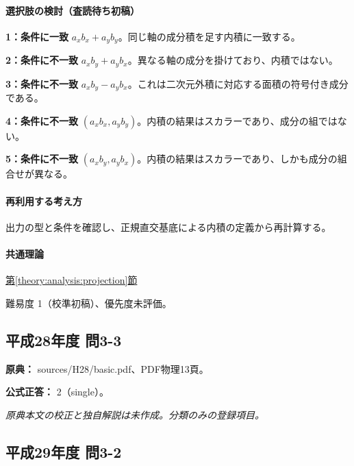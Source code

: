 \paragraph{選択肢の検討（査読待ち初稿）}\mbox{}\par

\noindent\textbf{1：条件に一致} \(a_xb_x+a_yb_y\)。同じ軸の成分積を足す内積に一致する。\par

\noindent\textbf{2：条件に不一致} \(a_xb_y+a_yb_x\)。異なる軸の成分を掛けており、内積ではない。\par

\noindent\textbf{3：条件に不一致} \(a_xb_y-a_yb_x\)。これは二次元外積に対応する面積の符号付き成分である。\par

\noindent\textbf{4：条件に不一致} \((a_xb_x,a_yb_y)\)。内積の結果はスカラーであり、成分の組ではない。\par

\noindent\textbf{5：条件に不一致} \((a_xb_y,a_yb_x)\)。内積の結果はスカラーであり、しかも成分の組合せが異なる。\par

\paragraph{再利用する考え方} 出力の型と条件を確認し、正規直交基底による内積の定義から再計算する。

\paragraph{共通理論} \hyperref[theory:analysis:projection]{第\ref*{theory:analysis:projection}節}

\par 難易度 1（校準初稿）、優先度未評価。

\subsection{平成28年度 問3-3}
\label{q:h28-reg-basic-3-3}

\noindent\textbf{原典：} sources/H28/basic.pdf、PDF物理13頁。

\textbf{公式正答：} 2（single）。

\par\textit{原典本文の校正と独自解説は未作成。分類のみの登録項目。}

\subsection{平成29年度 問3-2}
\label{q:h29-reg-basic-3-2}

